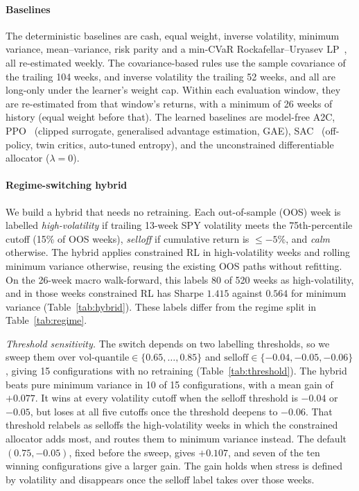 \documentclass[sigconf]{acmart}
\begin{document}
\paragraph{Baselines} The deterministic baselines are cash, equal weight, inverse
volatility, minimum variance, mean--variance, risk parity and a min-CVaR
Rockafellar--Uryasev LP~\cite{rockafellar2000optimization}, all re-estimated weekly. The
covariance-based rules use the sample covariance of the trailing 104 weeks, and inverse
volatility the trailing 52 weeks, and all are long-only under the learner's weight cap. Within each
evaluation window, they are re-estimated from that window's returns, with a minimum of 26 weeks
of history (equal weight before that). The learned baselines are model-free A2C,
PPO~\cite{schulman2017ppo} (clipped surrogate, generalised advantage estimation, GAE), SAC~\cite{haarnoja2018soft}
(off-policy, twin critics, auto-tuned entropy), and the unconstrained differentiable allocator ($\lambda=0$).

\paragraph{Regime-switching hybrid}
We build a hybrid that needs no retraining. Each out-of-sample (OOS) week is labelled
\emph{high-volatility} if trailing 13-week SPY volatility meets the 75th-percentile cutoff (15\%
of OOS weeks), \emph{selloff} if cumulative return is $\le -5\%$, and \emph{calm} otherwise. The
hybrid applies constrained RL in high-volatility weeks and rolling minimum variance otherwise,
reusing the existing OOS paths without refitting. On the 26-week macro walk-forward, this labels
80 of 520 weeks as high-volatility, and in those weeks constrained RL has Sharpe $1.415$ against
$0.564$ for minimum variance (Table~\ref{tab:hybrid}). These labels differ from the regime split
in Table~\ref{tab:regime}.

\emph{Threshold sensitivity.} The switch depends on two labelling thresholds, so
we sweep them over $\text{vol-quantile}\in\{0.65,\dots,0.85\}$ and $\text{selloff}\in\{-0.04,-0.05,-0.06\}$, giving 15 configurations with no retraining (Table~\ref{tab:threshold}).
The hybrid beats pure minimum variance in 10 of 15 configurations, with a mean gain of
$+0.077$. It wins at every volatility cutoff when the selloff threshold is $-0.04$
or $-0.05$, but loses at all five cutoffs once the threshold deepens to $-0.06$. That threshold
relabels as selloffs the high-volatility weeks in which the constrained allocator adds most,
and routes them to minimum variance instead. The default $(0.75,-0.05)$, fixed before the
sweep, gives $+0.107$, and seven of the ten winning configurations give a larger gain. The gain
holds when stress is defined by volatility and disappears once the selloff label takes over
those weeks.
\end{document}
